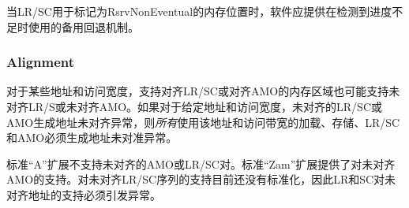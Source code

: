 {\iffalse
\begin{commentary}
When LR/SC is used for memory locations marked RsrvNonEventual, software should
provide alternative fall-back mechanisms used when lack of progress is
detected.
\end{commentary}
\fi
\begin{commentary}
当LR/SC用于标记为RsrvNonEventual的内存位置时，软件应提供在检测到进度不足时使用的备用回退机制。
\end{commentary}

\subsubsection{Alignment}

\iffalse
Memory regions that support aligned LR/SC or aligned AMOs might also support
misaligned LR/SC or misaligned AMOs for some addresses and access widths.  If,
for a given address and access width, a misaligned LR/SC or AMO generates
an address-misaligned exception, then {\em all} loads, stores, LRs/SCs, and
AMOs using that address and access width must generate address-misaligned
exceptions.
\fi
对于某些地址和访问宽度，支持对齐LR/SC或对齐AMO的内存区域也可能支持未对齐LR/S或未对齐AMO。如果对于给定地址和访问宽度，未对齐的LR/SC或AMO生成地址未对齐异常，则{\em 所有}使用该地址和访问带宽的加载、存储、LR/SC和AMO必须生成地址未对准异常。

\iffalse
\begin{commentary}
The standard ``A'' extension does not support misaligned AMOs or LR/SC pairs.
Support for misaligned AMOs is provided by the standard ``Zam'' extension.
Support for misaligned LR/SC sequences is not currently standardized,
so LR and SC to misaligned addresses must raise an exception.

Mandating that misaligned loads and stores raise address-misaligned exceptions
wherever misaligned AMOs raise address-misaligned exceptions permits the
emulation of misaligned AMOs in an M-mode trap handler.  The handler
guarantees atomicity by acquiring a global mutex and emulating the access
within the critical section.  Provided that the handler for misaligned loads
and stores uses the same mutex, all accesses to a given address that use the
same word size will be mutually atomic.
\end{commentary}
\fi
\begin{commentary}
标准“A”扩展不支持未对齐的AMO或LR/SC对。标准“Zam”扩展提供了对未对齐AMO的支持。对未对齐LR/SC序列的支持目前还没有标准化，因此LR和SC对未对齐地址的支持必须引发异常。


\end{commentary}}
